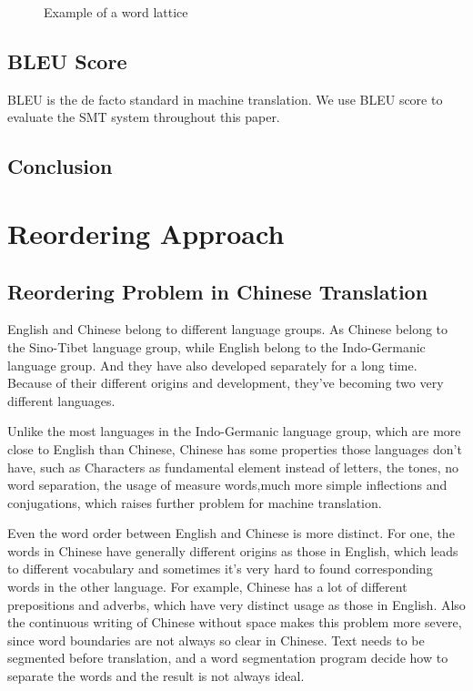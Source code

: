 \begin{landscape}
\begin{figure}
\centering

\caption{Example of a word lattice}
\end{figure}
\end{landscape}

\section{BLEU Score}
\label{ch:Foundations:sec:bleu}
BLEU is the de facto standard in machine translation\cite{metrics}. We use BLEU score to evaluate the SMT system throughout this paper.


\section{Conclusion}

\chapter{Reordering Approach}
\label{ch:ReorderingApproach}

\section{Reordering Problem in Chinese Translation}
\label{ch:ReorderingApproach:sec:Problem}

English and Chinese belong to different language groups. As Chinese belong to the Sino-Tibet language group, while English belong to the Indo-Germanic language group. And they have also developed separately for a long time. Because of their different origins and development, they've becoming two very different languages.

Unlike the most languages in the Indo-Germanic language group, which are more close to English than Chinese, Chinese has some properties those languages don't have, such as Characters as fundamental element instead of letters, the tones, no word separation, the usage of measure words,much more simple inflections and conjugations, which raises further problem for machine translation.

Even the word order between English and Chinese is more distinct. For one, the words in Chinese have generally different origins as those in English, which leads to different vocabulary and sometimes it's very hard to found corresponding words in the other language. For example, Chinese has a lot of different prepositions and adverbs, which have very distinct usage as those in English. Also the continuous writing of Chinese without space makes this problem more severe, since word boundaries are not always so clear in Chinese. Text needs to be segmented before translation, and a word segmentation program decide how to separate the words and the result is not always ideal.

